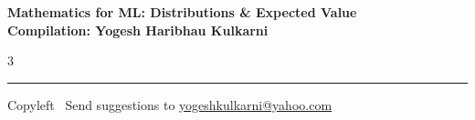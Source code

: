 \documentclass[8pt,landscape]{article}
\begin{document}
\footnotesize


\begin{center}
\Large{\textbf{Mathematics for ML: Distributions \& Expected Value\\ Compilation: Yogesh Haribhau Kulkarni}}
\end{center}

\begin{multicols}{3}

\end{multicols}

\rule{\linewidth}{0.25pt}
\scriptsize
Copyleft \textcopyleft\  Send suggestions to
\href{http://www.yogeshkulkarni.com}{yogeshkulkarni@yahoo.com}
\end{document}
